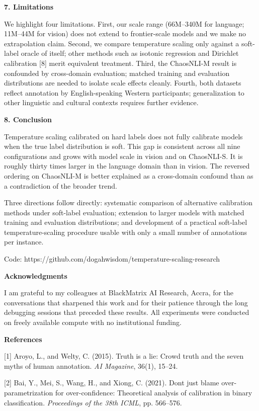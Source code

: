 \documentclass[11pt]{article}
\begin{document}
\textbf{7. Limitations}

We highlight four limitations. First, our scale range (66M--340M for
language; 11M--44M for vision) does not extend to frontier-scale models
and we make no extrapolation claim. Second, we compare temperature
scaling only against a soft-label oracle of itself; other methods such
as isotonic regression and Dirichlet calibration {[}8{]} merit
equivalent treatment. Third, the ChaosNLI-M result is confounded by
cross-domain evaluation; matched training and evaluation distributions
are needed to isolate scale effects cleanly. Fourth, both datasets
reflect annotation by English-speaking Western participants;
generalization to other linguistic and cultural contexts requires
further evidence.

\textbf{8. Conclusion}

Temperature scaling calibrated on hard labels does not fully calibrate
models when the true label distribution is soft. This gap is consistent
across all nine configurations and grows with model scale in vision and
on ChaosNLI-S. It is roughly thirty times larger in the language domain
than in vision. The reversed ordering on ChaosNLI-M is better explained
as a cross-domain confound than as a contradiction of the broader trend.

Three directions follow directly: systematic comparison of alternative
calibration methods under soft-label evaluation; extension to larger
models with matched training and evaluation distributions; and
development of a practical soft-label temperature-scaling procedure
usable with only a small number of annotations per instance.

Code: https://github.com/dogahwisdom/temperature-scaling-research

\textbf{Acknowledgments}

I am grateful to my colleagues at BlackMatrix AI Research, Accra, for
the conversations that sharpened this work and for their patience
through the long debugging sessions that preceded these results. All
experiments were conducted on freely available compute with no
institutional funding.

\textbf{References}

{[}1{]} Aroyo, L., and Welty, C. (2015). Truth is a lie: Crowd truth and
the seven myths of human annotation. \emph{AI Magazine}, 36(1), 15--24.

{[}2{]} Bai, Y., Mei, S., Wang, H., and Xiong, C. (2021).
Don\textquotesingle t just blame over-parametrization for
over-confidence: Theoretical analysis of calibration in binary
classification. \emph{Proceedings of the 38th ICML}, pp. 566--576.
\end{document}
